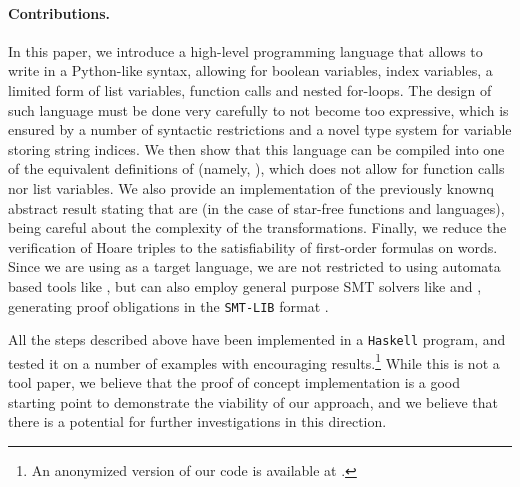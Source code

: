 \paragraph{Contributions.} \AP In this paper, we introduce a high-level
programming language that allows to write 
in a Python-like syntax, allowing for boolean variables, index variables, a
limited form of list variables, function calls and nested for-loops. The design
of such language must be done very carefully to not become too expressive,
which is ensured by a number of syntactic restrictions and a novel type system
for variable storing string indices. We then show that this language can be
compiled into one of the equivalent definitions of 
(namely, ), which does not allow for function calls nor
list variables. We also provide an implementation of the previously knownq
abstract result stating that  are  (in the case of star-free functions and languages), being careful
about the complexity of the transformations. Finally, we reduce the
verification of Hoare triples to the satisfiability of first-order formulas on
words. Since we are using  as a target language, we are
not restricted to using automata based tools like  \cite{MONA01},
but can also employ general purpose SMT solvers like  \cite{z3} and
 \cite{cvc5}, generating proof obligations in the \texttt{SMT-LIB}
format \cite{BARRETT17}.

All the steps described above have been implemented in a \texttt{Haskell}
program, and tested it on a number of examples with encouraging
results.\footnote{An anonymized version of our code is available at
\repositoryUrl.} While this is not a tool paper, we believe that the proof of
concept implementation is a good starting point to demonstrate the viability of
our approach, and we believe that there is a potential for further
investigations in this direction.


